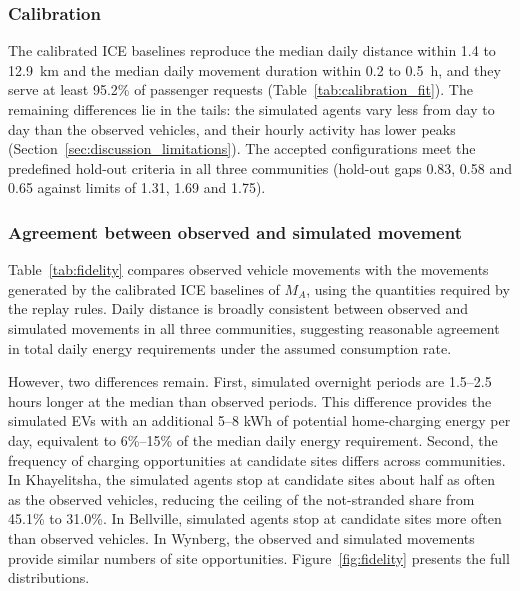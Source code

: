 \documentclass{elsarticle}
\newcommand{\MA}{\ensuremath{M_A}}
\begin{document}
\subsubsection{Calibration}

The calibrated ICE baselines reproduce the median daily distance within 1.4 to 12.9~km and the median daily movement duration within 0.2 to 0.5~h, and they serve at least 95.2\% of passenger requests (Table~\ref{tab:calibration_fit}). The remaining differences lie in the tails: the simulated agents vary less from day to day than the observed vehicles, and their hourly activity has lower peaks (Section~\ref{sec:discussion_limitations}). The accepted configurations meet the predefined hold-out criteria in all three communities (hold-out gaps 0.83, 0.58 and 0.65 against limits of 1.31, 1.69 and 1.75).

\subsubsection{Agreement between observed and simulated movement}

Table~\ref{tab:fidelity} compares observed vehicle movements with the movements generated by the calibrated ICE baselines of \(\MA\), using the quantities required by the replay rules. Daily distance is broadly consistent between observed and simulated movements in all three communities, suggesting reasonable agreement in total daily energy requirements under the assumed consumption rate.

However, two differences remain. First, simulated overnight periods are 1.5--2.5 hours longer at the median than observed periods. This difference provides the simulated EVs with an additional 5--8 kWh of potential home-charging energy per day, equivalent to 6\%--15\% of the median daily energy requirement. Second, the frequency of charging opportunities at candidate sites differs across communities. In Khayelitsha, the simulated agents stop at candidate sites about half as often as the observed vehicles, reducing the ceiling of the not-stranded share from 45.1\% to 31.0\%. In Bellville, simulated agents stop at candidate sites more often than observed vehicles. In Wynberg, the observed and simulated movements provide similar numbers of site opportunities. Figure~\ref{fig:fidelity} presents the full distributions.
\end{document}
